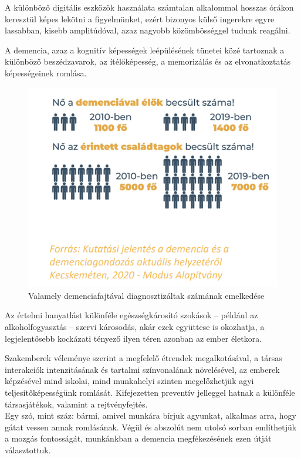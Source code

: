 \documentclass[tocnopagenum]{thesis-ekf}
\theoremstyle{definition}
\theoremstyle{remark}
\begin{document}
    A különböző digitális eszközök használata számtalan alkalommal hosszas órákon keresztül képes lekötni a figyelmünket, ezért bizonyos külső ingerekre egyre lassabban, kisebb amplitúdóval, azaz nagyobb közömbösséggel tudunk reagálni. 
    
    A demencia, azaz a kognitív képességek leépülésének tünetei közé tartoznak a különböző beszédzavarok, az ítélőképesség, a memorizálás és az elvonatkoztatás képességeinek romlása.
    
	\begin{figure}[h!]
		\centering
		\includegraphics[scale=0.7]{images/demencia.png}
		\caption{Valamely demenciafajtával diagnosztizáltak számának emelkedése}
		\label{fig:demencia}
	\end{figure}

	Az értelmi hanyatlást különféle egészségkárosító szokások -- például az alkoholfogyasztás -- szervi károsodás, akár ezek együttese is okozhatja, a legjelentősebb kockázati tényező ilyen téren azonban az ember életkora. 
	
	Szakemberek véleménye szerint a megfelelő étrendek megalkotásával, a társas interakciók intenzitásának és tartalmi színvonalának növelésével, az emberek képzésével mind iskolai, mind munkahelyi szinten megelőzhetjük agyi teljesítőképességünk romlását. 
	Kifejezetten preventív jelleggel hatnak a különféle társasjátékok, valamint a rejtvényfejtés.\\Egy szó, mint száz: bármi, amivel munkára bírjuk agyunkat, alkalmas arra, hogy gátat vessen annak romlásának.
	Végül és abszolút nem utolsó sorban említhetjük a mozgás fontosságát, munkánkban a demencia megfékezésének ezen útját választottuk.
\end{document}
